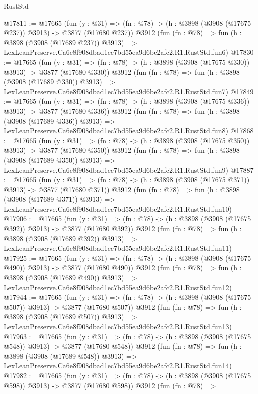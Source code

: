 \begin{lexlean}{RustStd}
\begin{coremodule}
@17811 := @17665
    (fun (y : @31) => (fn : @78) -> (h : @3898 (@3908 (@17675 @237)) @3913) -> @3877 (@17680 @237))
    @3912
    (fun (fn : @78) =>
    fun (h : @3898 (@3908 (@17689 @237)) @3913) =>
    LexLeanPreserve.Ca6e8f908dbad1ec7bd55ea9d6be2afc2.R1.RustStd.fun6)
@17830 := @17665
    (fun (y : @31) => (fn : @78) -> (h : @3898 (@3908 (@17675 @330)) @3913) -> @3877 (@17680 @330))
    @3912
    (fun (fn : @78) =>
    fun (h : @3898 (@3908 (@17689 @330)) @3913) =>
    LexLeanPreserve.Ca6e8f908dbad1ec7bd55ea9d6be2afc2.R1.RustStd.fun7)
@17849 := @17665
    (fun (y : @31) => (fn : @78) -> (h : @3898 (@3908 (@17675 @336)) @3913) -> @3877 (@17680 @336))
    @3912
    (fun (fn : @78) =>
    fun (h : @3898 (@3908 (@17689 @336)) @3913) =>
    LexLeanPreserve.Ca6e8f908dbad1ec7bd55ea9d6be2afc2.R1.RustStd.fun8)
@17868 := @17665
    (fun (y : @31) => (fn : @78) -> (h : @3898 (@3908 (@17675 @350)) @3913) -> @3877 (@17680 @350))
    @3912
    (fun (fn : @78) =>
    fun (h : @3898 (@3908 (@17689 @350)) @3913) =>
    LexLeanPreserve.Ca6e8f908dbad1ec7bd55ea9d6be2afc2.R1.RustStd.fun9)
@17887 := @17665
    (fun (y : @31) => (fn : @78) -> (h : @3898 (@3908 (@17675 @371)) @3913) -> @3877 (@17680 @371))
    @3912
    (fun (fn : @78) =>
    fun (h : @3898 (@3908 (@17689 @371)) @3913) =>
    LexLeanPreserve.Ca6e8f908dbad1ec7bd55ea9d6be2afc2.R1.RustStd.fun10)
@17906 := @17665
    (fun (y : @31) => (fn : @78) -> (h : @3898 (@3908 (@17675 @392)) @3913) -> @3877 (@17680 @392))
    @3912
    (fun (fn : @78) =>
    fun (h : @3898 (@3908 (@17689 @392)) @3913) =>
    LexLeanPreserve.Ca6e8f908dbad1ec7bd55ea9d6be2afc2.R1.RustStd.fun11)
@17925 := @17665
    (fun (y : @31) => (fn : @78) -> (h : @3898 (@3908 (@17675 @490)) @3913) -> @3877 (@17680 @490))
    @3912
    (fun (fn : @78) =>
    fun (h : @3898 (@3908 (@17689 @490)) @3913) =>
    LexLeanPreserve.Ca6e8f908dbad1ec7bd55ea9d6be2afc2.R1.RustStd.fun12)
@17944 := @17665
    (fun (y : @31) => (fn : @78) -> (h : @3898 (@3908 (@17675 @507)) @3913) -> @3877 (@17680 @507))
    @3912
    (fun (fn : @78) =>
    fun (h : @3898 (@3908 (@17689 @507)) @3913) =>
    LexLeanPreserve.Ca6e8f908dbad1ec7bd55ea9d6be2afc2.R1.RustStd.fun13)
@17963 := @17665
    (fun (y : @31) => (fn : @78) -> (h : @3898 (@3908 (@17675 @548)) @3913) -> @3877 (@17680 @548))
    @3912
    (fun (fn : @78) =>
    fun (h : @3898 (@3908 (@17689 @548)) @3913) =>
    LexLeanPreserve.Ca6e8f908dbad1ec7bd55ea9d6be2afc2.R1.RustStd.fun14)
@17982 := @17665
    (fun (y : @31) => (fn : @78) -> (h : @3898 (@3908 (@17675 @598)) @3913) -> @3877 (@17680 @598))
    @3912
    (fun (fn : @78) =>

\end{coremodule}
\end{lexlean}

